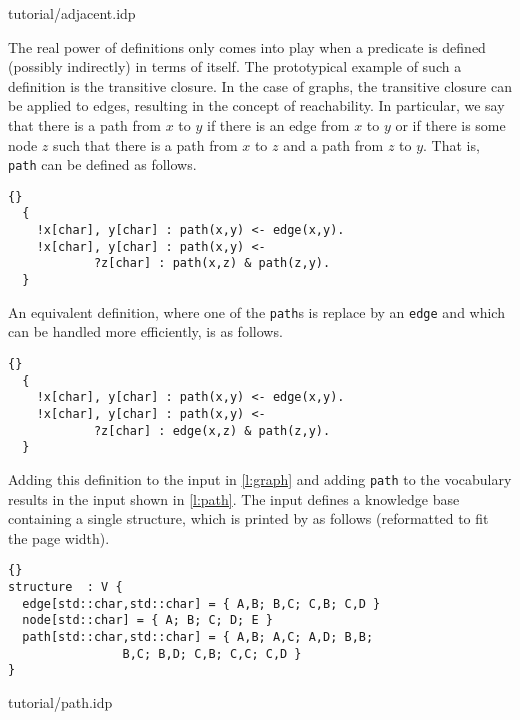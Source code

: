 \documentclass{article}
\begin{document}

	{tutorial/adjacent.idp}

The real power of definitions only comes into play when
a predicate is defined (possibly indirectly) in terms of itself.
The prototypical example of such a definition is the transitive closure.
In the case of graphs, the transitive closure can be applied to edges,
resulting in the concept of reachability.
In particular, we say that there is a path from $x$ to $y$ if there
is an edge from $x$ to $y$ or if there is some node $z$ such that there
is a path from $x$ to $z$ and a path from $z$ to $y$.
That is, \texttt{path} can be defined as follows.
\begin{lstlisting}{}
  {
    !x[char], y[char] : path(x,y) <- edge(x,y).
    !x[char], y[char] : path(x,y) <-
		    ?z[char] : path(x,z) & path(z,y).
  }
\end{lstlisting}
An equivalent definition, where one of the \texttt{path}s
is replace by an \texttt{edge} and which can be handled more efficiently,
is as follows.
\begin{lstlisting}{}
  {
    !x[char], y[char] : path(x,y) <- edge(x,y).
    !x[char], y[char] : path(x,y) <-
		    ?z[char] : edge(x,z) & path(z,y).
  }
\end{lstlisting}
Adding this definition to the input in \autoref{l:graph} and
adding \texttt{path}
to the vocabulary results in the input shown in \autoref{l:path}.
The input defines a knowledge base containing a single structure,
which is printed by \idp
as follows (reformatted to fit the page width).
\begin{lstlisting}{}
structure  : V {
  edge[std::char,std::char] = { A,B; B,C; C,B; C,D }
  node[std::char] = { A; B; C; D; E }
  path[std::char,std::char] = { A,B; A,C; A,D; B,B;
			    B,C; B,D; C,B; C,C; C,D }
}

\end{lstlisting}


	{tutorial/path.idp}
\end{document}
